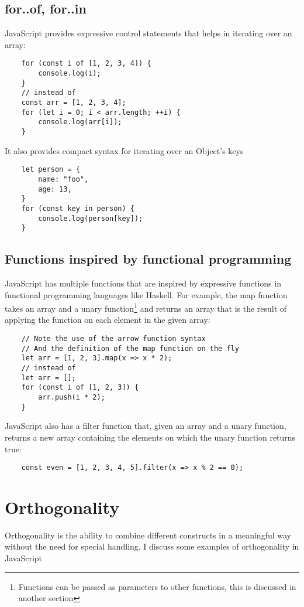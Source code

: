 \documentclass[11pt,a4paper]{article}
\begin{document}
\subsection{\label{for_of_for_in}for..of, for..in}
JavaScript provides expressive control statements that helps in iterating over an array:
\begin{verbatim}
    for (const i of [1, 2, 3, 4]) {
        console.log(i);
    }
    // instead of
    const arr = [1, 2, 3, 4];
    for (let i = 0; i < arr.length; ++i) {
        console.log(arr[i]);
    }
\end{verbatim}
It also provides compact syntax for iterating over an Object's keys
\begin{verbatim}
    let person = {
        name: "foo",
        age: 13,
    }
    for (const key in person) {
        console.log(person[key]);
    }
\end{verbatim}

\subsection{\label{fp_functions}Functions inspired by functional programming}
JavaScript has multiple functions that are inspired by expressive functions in functional programming languages like
Haskell.
For example, the map function takes an array and a unary
function\footnote{Functions can be passed as parameters to other functions, this is discussed in another section}
and returns an array that is the result of applying the function on each element in the given array:
\begin{verbatim}
    // Note the use of the arrow function syntax
    // And the definition of the map function on the fly
    let arr = [1, 2, 3].map(x => x * 2);
    // instead of
    let arr = [];
    for (const i of [1, 2, 3]) {
        arr.push(i * 2);
    }
\end{verbatim}
JavaScript also has a filter function that, given an array and a unary function,
returns a new array containing the elements on which the unary function returns true:
\begin{verbatim}
    const even = [1, 2, 3, 4, 5].filter(x => x % 2 == 0);
\end{verbatim}

\section{Orthogonality}
Orthogonality is the ability to combine different constructs in a meaningful way without the need for special handling.
I discuss some examples of orthogonality in JavaScript
\end{document}
